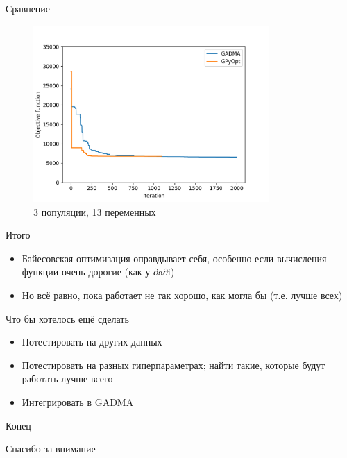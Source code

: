 \documentclass[
  russian,
  ignorenonframetext,
]{beamer}
\providecommand{\tightlist}{%
  \setlength{\itemsep}{0pt}\setlength{\parskip}{0pt}}
\begin{document}
\begin{frame}{Сравнение}
\protect\hypertarget{ux441ux440ux430ux432ux43dux435ux43dux438ux435-1}{}

\begin{figure}
\centering
\includegraphics[width=0.8\textwidth,height=\textheight]{./plots/3pop_13.best.log.png}
\caption{3 популяции, 13 переменных}
\end{figure}

\end{frame}

\begin{frame}{Итого}
\protect\hypertarget{ux438ux442ux43eux433ux43e}{}

\begin{itemize}
\tightlist
\item
  Байесовская оптимизация оправдывает себя, особенно если вычисления
  функции очень дорогие (как у ∂a∂i)
\item
  Но всё равно, \alert{пока} работает не так хорошо, как могла бы (т.е.
  лучше всех)
\end{itemize}

\end{frame}

\begin{frame}{Что бы хотелось ещё сделать}
\protect\hypertarget{ux447ux442ux43e-ux431ux44b-ux445ux43eux442ux435ux43bux43eux441ux44c-ux435ux449ux451-ux441ux434ux435ux43bux430ux442ux44c}{}

\begin{itemize}
\tightlist
\item
  Потестировать на других данных
\item
  Потестировать на разных гиперпараметрах; найти такие, которые будут работать лучше всего

\item
  Интегрировать в GADMA
\end{itemize}

\end{frame}

\begin{frame}[standout]{Конец}
\protect\hypertarget{ux43aux43eux43dux435ux446}{}

Спасибо за внимание

\end{frame}
\end{document}
